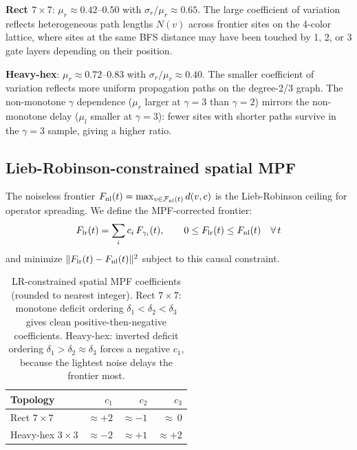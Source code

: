 \documentclass[12pt]{article}
\begin{document}
\textbf{Rect $7\times7$}: $\mu_r \approx 0.42$--$0.50$ with $\sigma_r/\mu_r \approx 0.65$.
The large coefficient of variation reflects heterogeneous path lengths $N(v)$
across frontier sites on the 4-color lattice, where sites at the same BFS distance
may have been touched by 1, 2, or 3 gate layers depending on their position.

\textbf{Heavy-hex}: $\mu_r \approx 0.72$--$0.83$ with $\sigma_r/\mu_r \approx 0.40$.
The smaller coefficient of variation reflects more uniform propagation paths on the degree-2/3 graph.
The non-monotone $\gamma$ dependence ($\mu_r$ larger at $\gamma=3$ than $\gamma=2$)
mirrors the non-monotone delay ($\mu_l$ smaller at $\gamma=3$): fewer sites
with shorter paths survive in the $\gamma=3$ sample, giving a higher ratio.

\subsection{Lieb-Robinson-constrained spatial MPF}
\label{sec:mpf}

The noiseless frontier $F_{\rm nl}(t) = \max_{v\in\mathcal{F}_{\rm nl}(t)} d(v,c)$
is the Lieb-Robinson ceiling for operator spreading.
We define the MPF-corrected frontier:
\begin{equation}
    F_{\rm lr}(t) = \sum_i c_i\, F_{\gamma_i}(t), \qquad
    0 \leq F_{\rm lr}(t) \leq F_{\rm nl}(t) \quad\forall\,t
    \label{eq:lr_mpf}
\end{equation}
and minimize $\|F_{\rm lr}(t) - F_{\rm nl}(t)\|^2$ subject to this causal constraint.

\begin{table}[h]
\centering
\small
\begin{tabular}{l rrr}
\toprule
Topology & $c_1$ & $c_2$ & $c_3$ \\
\midrule
Rect $7\times7$      & $\approx +2$ & $\approx -1$ & $\approx\ 0$ \\
Heavy-hex $3\times3$ & $\approx -2$ & $\approx +1$ & $\approx +2$ \\
\bottomrule
\end{tabular}
\caption{LR-constrained spatial MPF coefficients (rounded to nearest integer).
Rect $7\times7$: monotone deficit ordering $\delta_1 < \delta_2 < \delta_3$ gives
clean positive-then-negative coefficients.
Heavy-hex: inverted deficit ordering $\delta_1 > \delta_2 \approx \delta_3$
forces a negative $c_1$, because the lightest noise delays the frontier most.}
\label{tab:mpf}
\end{table}
\end{document}
